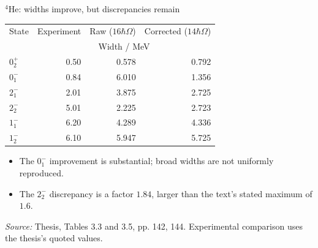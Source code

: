 \documentclass[aspectratio=169,11pt]{beamer}
\newcommand{\nuc}[2]{\ensuremath{{}^{#1}\mathrm{#2}}}
\newcommand{\src}[1]{\par\vfill{\color{muted}\fontsize{7.5}{9}\selectfont\textit{Source:} #1\par}}
\begin{document}
\begin{frame}{\nuc{4}{He}: widths improve, but discrepancies remain}
\small\renewcommand{\arraystretch}{1.3}
\begin{center}
\begin{tabular}{lrrr}
\toprule
State & Experiment & Raw ($16\hbar\Omega$) & Corrected ($14\hbar\Omega$)\\
 & \multicolumn{3}{c}{Width / MeV}\\\midrule
$0^+_2$ & 0.50 & 0.578 & 0.792\\
$0^-_1$ & 0.84 & 6.010 & 1.356\\
$2^-_1$ & 2.01 & 3.875 & 2.725\\
$2^-_2$ & 5.01 & 2.225 & 2.723\\
$1^-_1$ & 6.20 & 4.289 & 4.336\\
$1^-_2$ & 6.10 & 5.947 & 5.725\\\bottomrule
\end{tabular}
\end{center}
\begin{itemize}\setlength\itemsep{2mm}
\item The $0^-_1$ improvement is substantial; broad widths are not uniformly reproduced.
\item The $2^-_2$ discrepancy is a factor $1.84$, larger than the text's stated maximum of $1.6$.
\end{itemize}
\src{Thesis, Tables 3.3 and 3.5, pp. 142, 144. Experimental comparison uses the thesis's quoted values.}
\end{frame}
\end{document}

